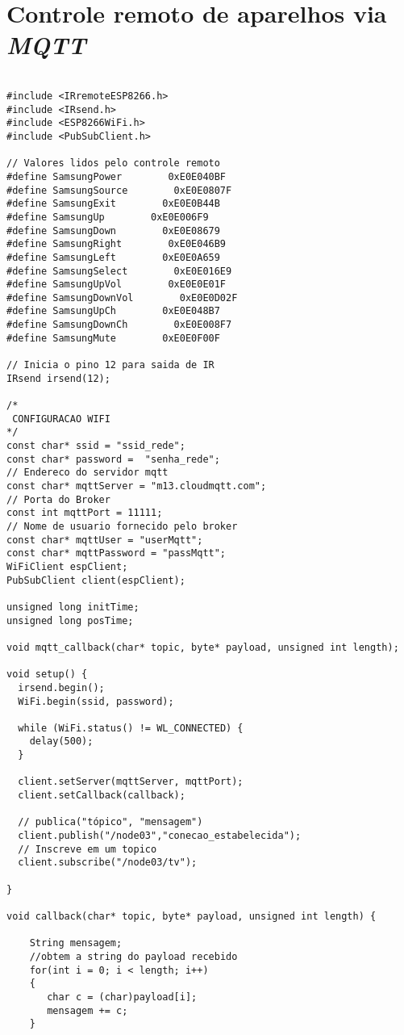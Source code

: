 \documentclass[
	11pt,				%
	openright,			%
	twoside,			%
	a5paper,			%
	english,			%
	french,				%
	spanish,			%
	brazil,				%
	sumario=tradicional
]{abntex2}
\begin{document}
\section{Controle remoto de aparelhos via \textit{MQTT}}

\begin{lstlisting}

#include <IRremoteESP8266.h>
#include <IRsend.h>
#include <ESP8266WiFi.h>
#include <PubSubClient.h>

// Valores lidos pelo controle remoto
#define SamsungPower        0xE0E040BF
#define SamsungSource        0xE0E0807F
#define SamsungExit        0xE0E0B44B
#define SamsungUp        0xE0E006F9
#define SamsungDown        0xE0E08679
#define SamsungRight        0xE0E046B9
#define SamsungLeft        0xE0E0A659
#define SamsungSelect        0xE0E016E9
#define SamsungUpVol        0xE0E0E01F
#define SamsungDownVol        0xE0E0D02F
#define SamsungUpCh        0xE0E048B7
#define SamsungDownCh        0xE0E008F7
#define SamsungMute        0xE0E0F00F

// Inicia o pino 12 para saida de IR
IRsend irsend(12);
 
/*
 CONFIGURACAO WIFI
*/ 
const char* ssid = "ssid_rede"; 
const char* password =  "senha_rede"; 
// Endereco do servidor mqtt
const char* mqttServer = "m13.cloudmqtt.com"; 
// Porta do Broker
const int mqttPort = 11111;
// Nome de usuario fornecido pelo broker
const char* mqttUser = "userMqtt";
const char* mqttPassword = "passMqtt"; 
WiFiClient espClient;
PubSubClient client(espClient);

unsigned long initTime;
unsigned long posTime;

void mqtt_callback(char* topic, byte* payload, unsigned int length);

void setup() {
  irsend.begin();
  WiFi.begin(ssid, password);
 
  while (WiFi.status() != WL_CONNECTED) {
    delay(500);
  }
 
  client.setServer(mqttServer, mqttPort);
  client.setCallback(callback);

  // publica("tópico", "mensagem")
  client.publish("/node03","conecao_estabelecida");
  // Inscreve em um topico
  client.subscribe("/node03/tv");
 
}
 
void callback(char* topic, byte* payload, unsigned int length) {
    
    String mensagem;
    //obtem a string do payload recebido
    for(int i = 0; i < length; i++) 
    {
       char c = (char)payload[i];
       mensagem += c;
    }
  

\end{lstlisting}
\end{document}
